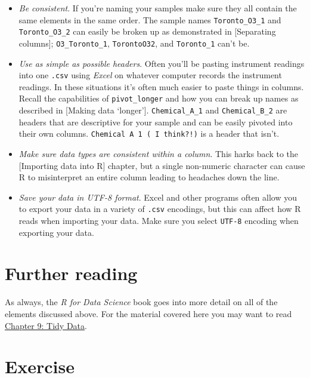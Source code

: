 \documentclass[
]{book}
\providecommand{\tightlist}{%
  \setlength{\itemsep}{0pt}\setlength{\parskip}{0pt}}
\begin{document}
\begin{itemize}
\tightlist
\item
  \emph{Be consistent}. If you're naming your samples make sure they all contain the same elements in the same order. The sample names \texttt{Toronto\_O3\_1} and \texttt{Toronto\_O3\_2} can easily be broken up as demonstrated in {[}Separating columns{]}; \texttt{O3\_Toronto\_1}, \texttt{TorontoO32}, and \texttt{Toronto\_1} can't be.
\item
  \emph{Use as simple as possible headers}. Often you'll be pasting instrument readings into one \texttt{.csv} using \emph{Excel} on whatever computer records the instrument readings. In these situations it's often much easier to paste things in columns. Recall the capabilities of \texttt{pivot\_longer} and how you can break up names as described in {[}Making data `longer'{]}. \texttt{Chemical\_A\_1} and \texttt{Chemical\_B\_2} are headers that are descriptive for your sample and can be easily pivoted into their own columns. \texttt{Chemical\ A\ 1\ (\ I\ think?!)} is a header that isn't.
\item
  \emph{Make sure data types are consistent within a column}. This harks back to the {[}Importing data into R{]} chapter, but a single non-numeric character can cause R to misinterpret an entire column leading to headaches down the line.
\item
  \emph{Save your data in UTF-8 format}. Excel and other programs often allow you to export your data in a variety of \texttt{.csv} encodings, but this can affect how R reads when importing your data. Make sure you select \texttt{UTF-8} encoding when exporting your data.
\end{itemize}

\hypertarget{further-reading-3}{%
\section{Further reading}\label{further-reading-3}}

As always, the \emph{R for Data Science} book goes into more detail on all of the elements discussed above. For the material covered here you may want to read \href{https://r4ds.had.co.nz/tidy-data.html}{Chapter 9: Tidy Data}.

\hypertarget{exercise-6}{%
\section{Exercise}\label{exercise-6}}
\end{document}
